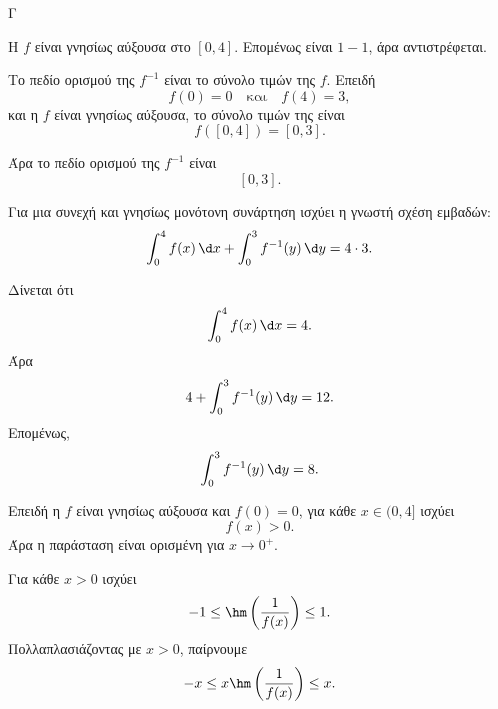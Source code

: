 \begin{thema}{Γ}

\begin{center}
\end{center}

\begin{erwthma}
\item Η $f$ είναι γνησίως αύξουσα στο $[0,4]$. Επομένως είναι $1-1$, άρα αντιστρέφεται.

Το πεδίο ορισμού της $f^{-1}$ είναι το σύνολο τιμών της $f$. Επειδή
\[
f(0)=0
\quad \text{και}\quad
f(4)=3,
\]
και η $f$ είναι γνησίως αύξουσα, το σύνολο τιμών της είναι
\[
f([0,4])=[0,3].
\]

Άρα το πεδίο ορισμού της $f^{-1}$ είναι
\[
[0,3].
\]

\item Για μια συνεχή και γνησίως μονότονη συνάρτηση ισχύει η γνωστή σχέση εμβαδών:
\[
\int_0^4 f(x)\,\d x+\int_0^3 f^{-1}(y)\,\d y=4\cdot 3.
\]

Δίνεται ότι
\[
\int_0^4 f(x)\,\d x=4.
\]
Άρα
\[
4+\int_0^3 f^{-1}(y)\,\d y=12.
\]
Επομένως,
\[
\int_0^3 f^{-1}(y)\,\d y=8.
\]

\item Επειδή η $f$ είναι γνησίως αύξουσα και $f(0)=0$, για κάθε $x\in(0,4]$ ισχύει
\[
f(x)>0.
\]
Άρα η παράσταση είναι ορισμένη για $x\to 0^+$.

Για κάθε $x>0$ ισχύει
\[
-1\leq \hm\left(\frac{1}{f(x)}\right)\leq 1.
\]
Πολλαπλασιάζοντας με $x>0$, παίρνουμε
\[
-x\leq x\hm\left(\frac{1}{f(x)}\right)\leq x.
\]


\end{erwthma}
\end{thema}
